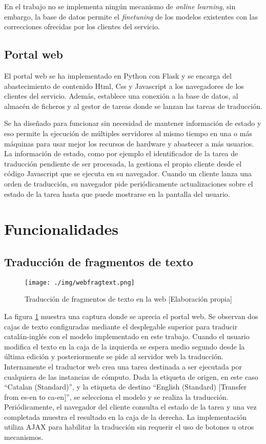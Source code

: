 En el trabajo no se implementa ningún mecanismo de \textit{online learning}, sin embargo, la base de datos permite el \textit{finetuning} de los modelos existentes con las correcciones ofrecidas por los clientes del servicio.

\subsection{Portal web}
El portal web se ha implementado en Python con Flask y se encarga del abastecimiento de contenido Html, Css y Javascript a los navegadores de los clientes del servicio. Además, establece una conexión a la base de datos, al almacén de ficheros y al gestor de tareas donde se lanzan las tareas de traducción.

Se ha diseñado para funcionar sin necesidad de mantener información de estado y eso permite la ejecución de múltiples servidores al mismo tiempo en una o más máquinas para usar mejor los recursos de hardware y abastecer a más usuarios. La información de estado, como por ejemplo el identificador de la tarea de traducción pendiente de ser procesada, la gestiona el propio cliente desde el código Javascript que se ejecuta en su navegador. Cuando un cliente lanza una orden de traducción, su navegador pide periódicamente actualizaciones sobre el estado de la tarea hasta que puede mostrarse en la pantalla del usuario.

\section{Funcionalidades}
\subsection{Traducción de fragmentos de texto}
\begin{figure}[H]
    \centering
    \texttt{[image: ./img/webfragtext.png]}
    \caption{Traducción de fragmentos de texto en la web [Elaboración propia]}\label{webfrag}
\end{figure}

La figura \ref{webfrag} muestra una captura donde se aprecia el portal web. Se observan dos cajas de texto configuradas mediante el desplegable superior para traducir catalán-inglés con el modelo implementado en este trabajo.
Cuando el usuario modifica el texto en la caja de la izquierda se espera medio segundo desde la última edición y posteriormente se pide al servidor web la traducción. Internamente el traductor web crea una tarea destinada a ser ejecutada por cualquiera de las instancias de cómputo. Dada la etiqueta de origen, en este caso ``Catalan (Standard)'', y la etiqueta de destino ``English (Standard) [Transfer from es-en to ca-en]'', se selecciona el modelo y se realiza la traducción.
Periódicamente, el navegador del cliente consulta el estado de la tarea y una vez completada muestra el resultado en la caja de la derecha. La implementación utiliza AJAX para habilitar la traducción sin requerir el uso de botones u otros mecanismos.

